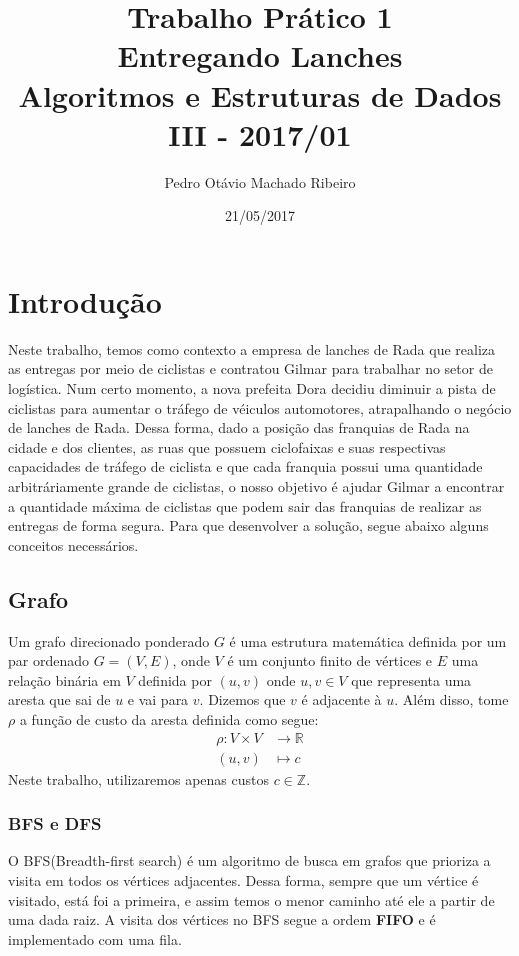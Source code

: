 \documentclass[
	12pt,
	a4paper,
	onepage,
	brazil
]{article}
\author{Pedro Otávio Machado Ribeiro}
\title{Trabalho Prático 1\\Entregando Lanches\\Algoritmos e Estruturas de Dados III - 2017/01}
\date{21/05/2017}
\theoremstyle{definition}
\begin{document}
	\maketitle
	
	\section{Introdução}
	
	Neste trabalho, temos como contexto a empresa de lanches de Rada que realiza as entregas por meio de ciclistas e contratou Gilmar para trabalhar no setor de logística. Num certo momento, a nova prefeita Dora decidiu diminuir a pista de ciclistas para aumentar o tráfego de véiculos automotores, atrapalhando o negócio de lanches de Rada. Dessa forma, dado a posição das franquias de Rada na cidade e dos clientes, as ruas que possuem ciclofaixas e suas respectivas capacidades de tráfego de ciclista e que cada franquia possui uma quantidade arbitráriamente grande de ciclistas, o nosso objetivo é ajudar Gilmar a encontrar a quantidade máxima de ciclistas que podem sair das franquias de realizar as entregas de forma segura. Para que desenvolver a solução, segue abaixo alguns conceitos necessários.
	
	\subsection{Grafo}
	
	Um grafo direcionado ponderado $G$ é uma estrutura matemática definida por um par ordenado $G = (V,E)$, onde $V$ é um conjunto finito de vértices e $E$ uma relação binária em $V$ definida por $(u,v)$ onde $u,v \in V$ que representa uma aresta que sai de $u$ e vai para $v$. Dizemos que $v$ é adjacente à $u$. Além disso, tome $\rho$ a função de custo da aresta definida como segue:
	\begin{align*}
	\rho \colon  V\times V &\to \mathbb{R} \\
	(u,v) &\mapsto c
	\end{align*}
	Neste trabalho, utilizaremos apenas custos $c \in \mathbb{Z}$.
	
	\subsubsection{BFS e DFS}
	
	O BFS(Breadth-first search) é um algoritmo de busca em grafos que prioriza a visita em todos os vértices adjacentes. Dessa forma, sempre que um vértice é visitado, está foi a primeira, e assim temos o menor caminho até ele a partir de uma dada raiz. A visita dos vértices no BFS segue a ordem \textbf{FIFO} e é implementado com uma fila.
	
\end{document}
